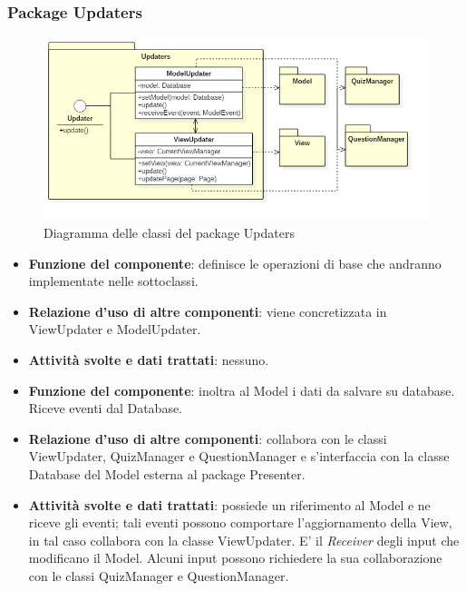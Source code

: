 \documentclass[a4paper,11pt]{article}
\begin{document}
			\subsubsection{Package Updaters}
			\begin{figure}[h!]
			\begin{center}
				\includegraphics[scale=0.65]{../images/UpdatersClass.png}
				\caption{Diagramma delle classi del package Updaters}
			\end{center}
			\end{figure}
			\begin{itemize}
				\item\textbf{Funzione del componente}: definisce le operazioni di base che andranno implementate nelle sottoclassi.
				\item\textbf{Relazione d'uso di altre componenti}: viene concretizzata in ViewUpdater e ModelUpdater.
				\item\textbf{Attività svolte e dati trattati}: nessuno.
			\end{itemize}
			
			\begin{itemize}
				\item\textbf{Funzione del componente}: inoltra al Model i dati da salvare su database. Riceve eventi dal Database.
				\item\textbf{Relazione d'uso di altre componenti}: collabora con le classi ViewUpdater, QuizManager e QuestionManager e s'interfaccia con la classe Database del Model esterna al package Presenter.
				\item\textbf{Attività svolte e dati trattati}: possiede un riferimento al Model e ne riceve gli eventi; tali eventi possono comportare l'aggiornamento della View, in tal caso collabora con la classe ViewUpdater. E' il \emph{Receiver} degli input che modificano il Model. Alcuni input possono richiedere la sua collaborazione con le classi QuizManager e QuestionManager.
			\end{itemize}
\end{document}
